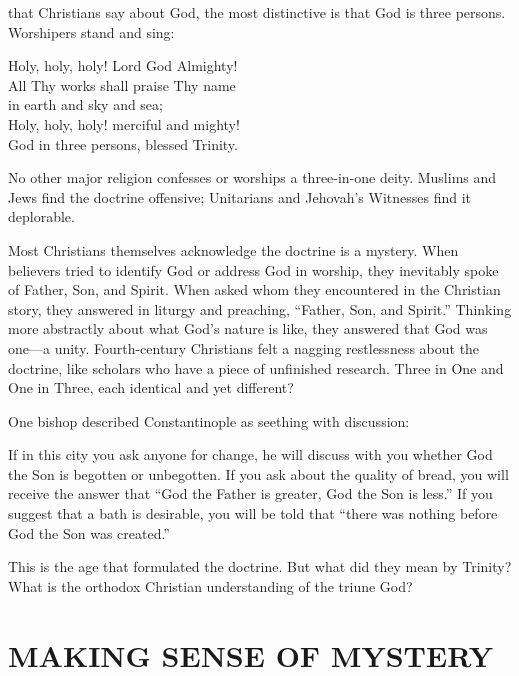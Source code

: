 
 that Christians say about God, the most distinctive is that God is
three persons. Worshipers stand and sing:

\begin{poem}
Holy, holy, holy! Lord God Almighty!\\
All Thy works shall praise Thy name\\
in earth and sky and sea;\\
Holy, holy, holy! merciful and mighty!\\
God in three persons, blessed Trinity.
\end{poem}

No other major religion confesses or worships a three-in-one deity. Muslims and Jews find the
doctrine offensive; Unitarians and Jehovah’s Witnesses find it deplorable.

Most Christians themselves acknowledge the doctrine is a mystery. When believers tried to identify
God or address God in worship, they inevitably spoke of Father, Son, and Spirit. When asked whom
they encountered in the Christian story, they answered in liturgy and preaching, “Father, Son, and
Spirit.” Thinking more abstractly about what God’s nature is like, they answered that God was one—a
unity. Fourth-century Christians felt a nagging restlessness about the doctrine, like scholars who
have a piece of unfinished research. Three in One and One in Three, each identical and yet
different?

One bishop described Constantinople as seething with discussion:

\begin{blockquote}
If in this city you ask anyone for change, he will discuss with you whether God the Son is begotten
or unbegotten. If you ask about the quality of bread, you will receive the answer that “God the
Father is greater, God the Son is less.” If you suggest that a bath is desirable, you will be told
that “there was nothing before God the Son was created.”
\end{blockquote}

This is the age that formulated the doctrine. But what did they mean by Trinity? What is the
orthodox Christian understanding of the triune God?

\section{MAKING SENSE OF MYSTERY}

